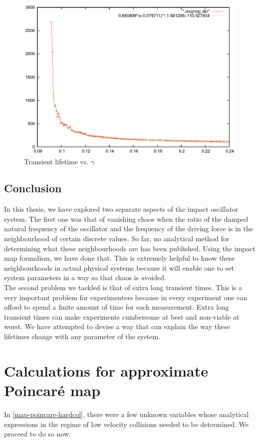 \documentclass{book}
\renewcommand{\(}{\begin{columns}}
\renewcommand{\)}{\end{columns}}
\newcommand{\<}[1]{\begin{column}{#1}}
\renewcommand{\>}{\end{column}}
\begin{document}
\begin{figure}
\caption{Transient lifetime vs.  $\gamma$}
\begin{center}
\includegraphics[width=0.8\columnwidth]{trans_life_vsg_matches_somewhat}
\end{center}
\end{figure}


\section{Conclusion}
In this thesis, we have explored two separate aspects of the impact oscillator 
system.  The first one was that of vanishing chaos when the ratio of the 
damped natural frequency of the oscillator and the frequency of the driving 
force is in the neighbourhood of certain discrete values.  So far, no 
analytical method 
for determining what these neighbourhoods are has been published. Using the 
	impact map formalism, we have done that.  This is extremely helpful
to know these neighbourhoods in actual physical systems because it will enable 
one to set system parameters in a way so that chaos is avoided.  \\

The second problem we tackled is that of extra long transient times.  This is 
a very important problem for experimenters because in every experiment one can 
afford to spend a finite amount of time for each measurement.  Extra long 
transient times can make experiments cumbersome at best and non-viable at 
worst.  We have attempted to devise a way that can explain the way these lifetimes change with any 
parameter of the system.  



\appendix
\chapter{Calculations for approximate Poincaré map}
In \eqref{map-poincare-hardcol}, there were a few unknown variables whose 
analytical expressions in the regime of low velocity collisions 
needed to be determined.  We proceed to do so now:
\end{document}
